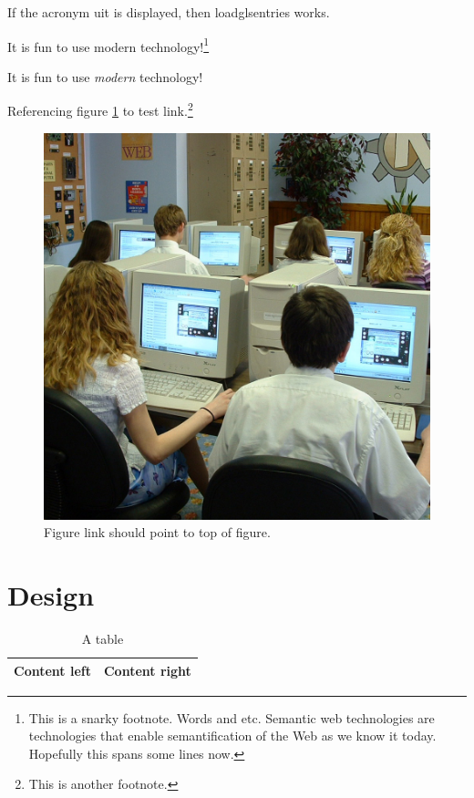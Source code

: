 \documentclass[final,11pt,baselinegrid]{../../uit-thesis}
\begin{document}
If the acronym \ac{uit} is displayed, then loadglsentries works.

It is fun to use modern  technology!\footnote{This is a snarky
footnote. Words and etc. Semantic web technologies are technologies that enable
semantification of the Web as we know it today. Hopefully this spans some lines
now.}

It is fun to use \emph{modern } technology!

Referencing figure \ref{fig:ex} to test link.\footnote{This is another
footnote.}

\begin{figure}\label{fig:ex}
\centering
\includegraphics[scale=0.1]{748443511_095ae916df_o.jpg}
\caption{Figure link should point to top of figure.}
\end{figure}

\chapter{Design}
\lipsum[8-10]

\begin{table}
\centering
\begin{tabular}{|l|l|}
\hline
Content left & Content right\\
\hline
\end{tabular}
\caption{A table}
\end{table}
\end{document}
